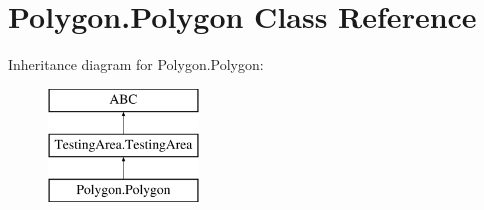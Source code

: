 \hypertarget{class_polygon_1_1_polygon}{}\section{Polygon.\+Polygon Class Reference}
\label{class_polygon_1_1_polygon}
Inheritance diagram for Polygon.\+Polygon\+:\begin{figure}[H]
\begin{center}
\leavevmode
\includegraphics[height=3.000000cm]{class_polygon_1_1_polygon}
\end{center}
\end{figure}
